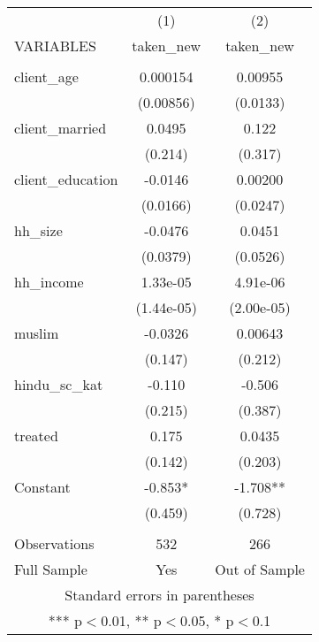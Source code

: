 \begin{tabular}{lcc} \hline
 & (1) & (2) \\
VARIABLES & taken\_new & taken\_new \\ \hline
 &  &  \\
client\_age & 0.000154 & 0.00955 \\
 & (0.00856) & (0.0133) \\
client\_married & 0.0495 & 0.122 \\
 & (0.214) & (0.317) \\
client\_education & -0.0146 & 0.00200 \\
 & (0.0166) & (0.0247) \\
hh\_size & -0.0476 & 0.0451 \\
 & (0.0379) & (0.0526) \\
hh\_income & 1.33e-05 & 4.91e-06 \\
 & (1.44e-05) & (2.00e-05) \\
muslim & -0.0326 & 0.00643 \\
 & (0.147) & (0.212) \\
hindu\_sc\_kat & -0.110 & -0.506 \\
 & (0.215) & (0.387) \\
treated & 0.175 & 0.0435 \\
 & (0.142) & (0.203) \\
Constant & -0.853* & -1.708** \\
 & (0.459) & (0.728) \\
 &  &  \\
Observations & 532 & 266 \\
 Full Sample & Yes & Out of Sample \\ \hline
\multicolumn{3}{c}{ Standard errors in parentheses} \\
\multicolumn{3}{c}{ *** p$<$0.01, ** p$<$0.05, * p$<$0.1} \\
\end{tabular}

